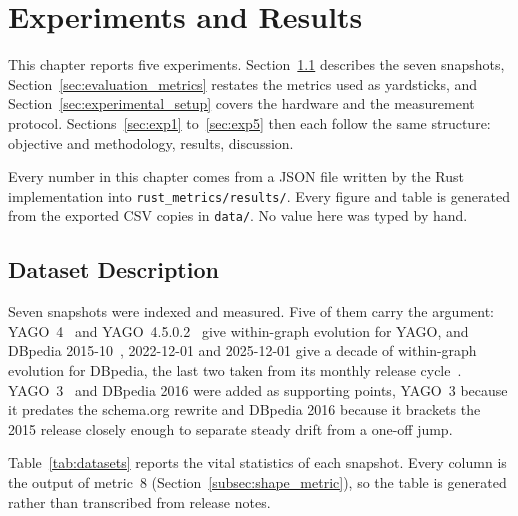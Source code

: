 \chapter{Experiments and Results}
\label{chap:experiments}

This chapter reports five experiments. Section~\ref{sec:datasets} describes the
seven snapshots, Section~\ref{sec:evaluation_metrics} restates the metrics used
as yardsticks, and Section~\ref{sec:experimental_setup} covers the hardware and
the measurement protocol. Sections~\ref{sec:exp1} to~\ref{sec:exp5} then each
follow the same structure: objective and methodology, results, discussion.

Every number in this chapter comes from a JSON file written by the Rust
implementation into \texttt{rust\_metrics/results/}. Every figure and table is
generated from the exported CSV copies in \texttt{data/}. No value here was typed
by hand.

\section{Dataset Description}
\label{sec:datasets}

Seven snapshots were indexed and measured. Five of them carry the argument:
YAGO~4~\cite{tanon2020yago} and YAGO~4.5.0.2~\cite{suchanek2024yago45} give
within-graph evolution for YAGO, and DBpedia 2015-10~\cite{lehmann2015dbpedia},
2022-12-01 and 2025-12-01 give a decade of within-graph evolution for DBpedia,
the last two taken from its monthly release cycle~\cite{hofer2020dbpedia}. YAGO~3~\cite{mahdisoltani2015yago3} and DBpedia 2016 were added as supporting points, YAGO~3 because
it predates the schema.org rewrite and DBpedia 2016 because it brackets the 2015
release closely enough to separate steady drift from a one-off jump.

Table~\ref{tab:datasets} reports the vital statistics of each snapshot. Every
column is the output of metric~8 (Section~\ref{subsec:shape_metric}), so the
table is generated rather than transcribed from release notes.

